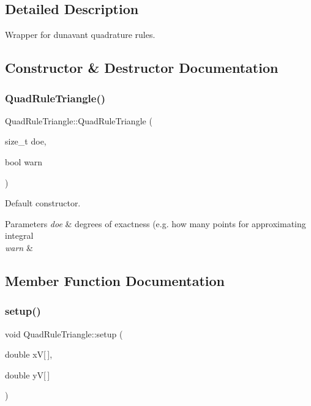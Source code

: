 \subsection{Detailed Description}
Wrapper for dunavant quadrature rules. 

\subsection{Constructor \& Destructor Documentation}
\mbox{\label{classHCore2D_1_1QuadRuleTriangle_a83a432b56c03fffa615ec85f5dfd57d7}} 
\subsubsection{\texorpdfstring{Quad\+Rule\+Triangle()}{QuadRuleTriangle()}}
{\footnotesize\ttfamily Quad\+Rule\+Triangle\+::\+Quad\+Rule\+Triangle (\begin{DoxyParamCaption}\item[{size\+\_\+t}]{doe,  }\item[{bool}]{warn }\end{DoxyParamCaption})}



Default constructor. 


\begin{DoxyParams}{Parameters}
{\em doe} & degrees of exactness (e.\+g. how many points for approximating integral \\
\hline
{\em warn} & \\
\hline
\end{DoxyParams}


\subsection{Member Function Documentation}
\mbox{\label{classHCore2D_1_1QuadRuleTriangle_aa2cd3081837b1cb46f6573ceb16de7b2}} 
\subsubsection{\texorpdfstring{setup()}{setup()}}
{\footnotesize\ttfamily void Quad\+Rule\+Triangle\+::setup (\begin{DoxyParamCaption}\item[{double}]{xV\mbox{[}$\,$\mbox{]},  }\item[{double}]{yV\mbox{[}$\,$\mbox{]} }\end{DoxyParamCaption})}




